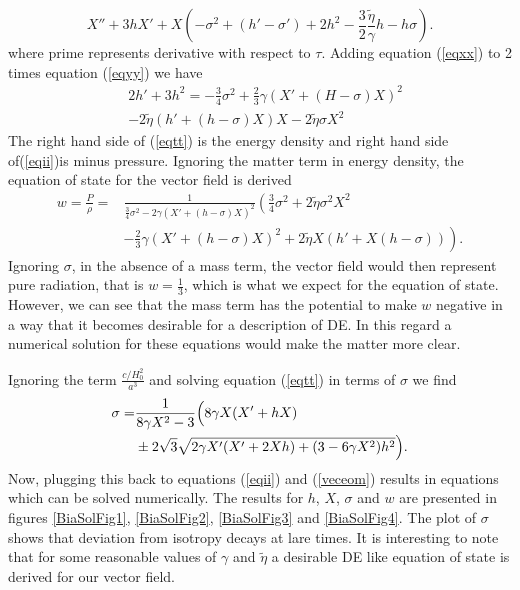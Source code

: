 \documentclass[%
 reprint,
 amsmath,amssymb,
 aps,
]{revtex4-1}
\begin{document}
\begin{equation}\label{veceom}
X''+3hX'+X\left(-\sigma^2+(h'-\sigma')+2 h^2-\frac{3}{2}\frac{\tilde{\eta}}{\gamma} h- h\sigma\right).
\end{equation}
where prime represents derivative with respect to $\tau$. Adding equation (\ref{eqxx}) to 2 times equation (\ref{eqyy}) we  have
\begin{equation}\label{eqii}
\begin{split}
&2h'+3h^2=-\frac{3}{4}\sigma^2+\frac{2}{3}\gamma(X'+(H-\sigma)X)^2\\
&-2\tilde{\eta}(h'+(h-\sigma)X)X-2\tilde{\eta}\sigma X^2
\end{split}
\end{equation}
The right hand side of (\ref{eqtt}) is the energy density and right hand side of(\ref{eqii})is minus pressure. Ignoring the matter term in energy density, the equation of state for the vector field is derived
\begin{equation}
\begin{split}
w=\frac{P}{\rho}=&\frac{1}{\frac{3}{4}\sigma^2-2\gamma (X'+(h-\sigma)X)^2}\left(\frac{3}{4}\sigma^2+2\tilde{\eta} \sigma^2X^2\right.\\
&\left. -\frac{2}{3}\gamma(X'+(h-\sigma)X)^2+2\tilde{\eta} X(h'+X(h-\sigma))\right).
\end{split}
\end{equation}
Ignoring $\sigma$, in the absence of a mass term, the vector field would then represent pure radiation, that is $w=\frac{1}{3}$, which is what we expect for the equation of state. However, we can see that the mass term has the potential to make $w$ negative in a way that it becomes desirable for a description of DE. In this regard a numerical solution for these equations would make the matter more clear.

Ignoring the term $\frac{c/H_0^2}{a^3}$ and solving equation (\ref{eqtt}) in terms of $\sigma$ we find
\begin{equation}
\begin{split}
\sigma=&\frac{1}{8\gamma X^2-3}\Bigl(8\gamma X(X'+hX)\\
&\pm 2\sqrt{3}\sqrt{2\gamma X'(X'+2Xh)+(3-6\gamma X^2)h^2}\Bigr).
\end{split}
\end{equation}
Now, plugging this back to equations (\ref{eqii}) and (\ref{veceom}) results in equations which can be solved numerically. The results for $h$, $X$, $\sigma$  and $w$ are presented in figures \ref{BiaSolFig1}, \ref{BiaSolFig2}, \ref{BiaSolFig3} and \ref{BiaSolFig4}. The plot of $\sigma$ shows that deviation from isotropy decays at lare times.  It is interesting to note that for some reasonable values of $\gamma$ and $\tilde{\eta}$ a desirable DE like equation of state is derived for our vector field.
\end{document}
